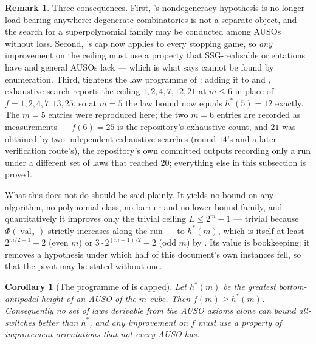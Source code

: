 \documentclass[11pt]{article}
\theoremstyle{plain}
\newtheorem{corollary}[theorem]{Corollary}
\theoremstyle{definition}
\newtheorem{remark}[theorem]{Remark}
\DeclareMathOperator{\val}{val}
\begin{document}
\begin{remark}\label{rem:flat}
Three consequences. First, 's nondegeneracy hypothesis
is no longer load-bearing anywhere: degenerate combinatorics is not a
separate object, and the search for a superpolynomial family may be conducted
among AUSOs without loss. Second, 's cap now applies to
every stopping game, so \emph{any} improvement on the ceiling must use a
property that SSG-realisable orientations have and general AUSOs lack ---
which is what  says cannot be found by enumeration.
Third,  tightens the law programme of
: adding it to  and
, exhaustive search reports the ceiling
$1,2,4,7,12,21$ at $m\le6$ in place of $f=1,2,4,7,13,25$, so at $m=5$ the
law bound now equals $h^{\ast}(5)=12$ exactly. The $m=5$ entries were
reproduced here; the two $m=6$ entries are recorded as measurements ---
$f(6)=25$ is the repository's exhaustive count, and $21$ was obtained by
two independent exhaustive searches (round $14$'s and a later verification
route's), the repository's own committed outputs recording only a run
under a different set of laws that reached $20$;
everything else in this subsection is proved.

What this does not do should be said plainly. It yields no bound on any
algorithm, no polynomial class, no barrier and no lower-bound family, and
quantitatively it improves only the trivial ceiling $L\le2^{m}-1$ --- trivial
because $\Phi(\val_{\sigma})$ strictly increases along the run --- to
$h^{\ast}(m)$, which is itself at least $2^{m/2+1}-2$ (even $m$) or
$3\cdot2^{(m-1)/2}-2$ (odd $m$) by . Its value is
bookkeeping: it removes a hypothesis under which half of this document's
own instances fell, so that the pivot may be stated without one.
\end{remark}

\begin{corollary}[The programme of  is capped]\label{cor:f-auso}
Let $h^{\ast}(m)$ be the greatest bottom-antipodal height of an AUSO of the
$m$-cube. Then $f(m)\ge h^{\ast}(m)$. Consequently no set of laws derivable from
the AUSO axioms alone can bound all-switches better than $h^{\ast}$, and any
improvement on $f$ must use a property of improvement orientations that not
every AUSO has.
\end{corollary}
\end{document}
